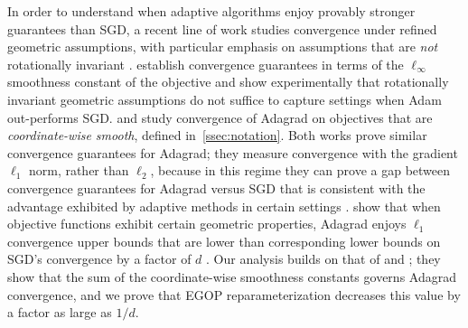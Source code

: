 In order to understand when adaptive algorithms enjoy provably stronger guarantees than SGD, a recent line of work studies convergence under refined geometric assumptions, with particular emphasis on assumptions that are \textit{not} rotationally invariant \cite{jiang2024convergence, liu2024adagrad, xie2024adamexploitsellinftygeometryloss}. \citet{xie2024adamexploitsellinftygeometryloss} establish convergence guarantees in terms of the $\ell_{\infty}$ smoothness constant of the objective and show experimentally that rotationally invariant geometric assumptions do not suffice to capture settings when Adam out-performs SGD. \citet{jiang2024convergence} and \citet{liu2024adagrad} study convergence of Adagrad on objectives that are \textit{coordinate-wise smooth}, defined in~\cref{ssec:notation}. Both works prove similar convergence guarantees for Adagrad; they measure convergence with the gradient $\ell_1$ norm, rather than $\ell_2$, because in this regime they can prove a gap between convergence guarantees for Adagrad versus SGD that is consistent with the advantage exhibited by adaptive methods in certain settings \cite{jiang2024convergence}.
\citet{jiang2024convergence} show that when objective functions exhibit certain geometric properties, Adagrad enjoys $\ell_1$ convergence upper bounds that are lower than corresponding lower bounds on SGD's convergence by a factor of $d$ \cite{jiang2024convergence}. Our analysis builds on that of \citet{jiang2024convergence} and \citet{liu2024adagrad}; they show that the sum of the coordinate-wise smoothness constants governs Adagrad convergence, and we prove that EGOP reparameterization decreases this value by a factor as large as $1/d$.

